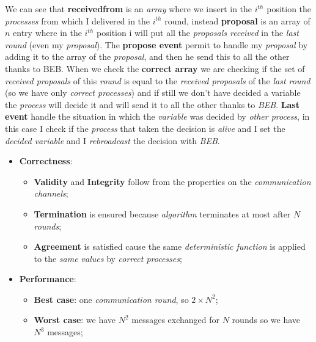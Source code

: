 \documentclass{article}
\begin{document}
We can see that \textbf{receivedfrom} is an \emph{array} where we insert in the $i^{th}$ position the \emph{processes} from which I delivered in the $i^{th}$ round, instead \textbf{proposal} is an array of $n$ entry where in the $i^{th}$ position i will put all the \emph{proposals received} in the \emph{last round} (even my \emph{proposal}). The \textbf{propose event} permit to handle my \emph{proposal} by adding it to the array of the \emph{proposal}, and then he send this to all the other thanks to BEB. When we check the \textbf{correct array} we are checking if the set of \emph{received proposals} of this \emph{round} is equal to the \emph{received proposals} of the \emph{last round} (so we have only \emph{correct processes}) and if still we don't have decided a variable the \emph{process} will decide it and will send it to all the other thanks to \emph{BEB}. \textbf{Last event} handle the situation in which the \emph{variable} was decided by \emph{other process}, in this case I check if the \emph{process} that taken the decision is \emph{alive} and I set the \emph{decided variable} and I \emph{rebroadcast} the decision with \emph{BEB}.
\begin{itemize}
\item \textbf{Correctness}:
\begin{itemize}
\item \textbf{Validity} and \textbf{Integrity} follow from the properties on the \emph{communication channels};
\item \textbf{Termination} is ensured because \emph{algorithm} terminates at most after $N$ \emph{rounds};
\item \textbf{Agreement} is satisfied cause the same \emph{deterministic function} is applied to the \emph{same values} by \emph{correct processes};
\end{itemize}
\item \textbf{Performance}:
\begin{itemize}
\item \textbf{Best case}: one \emph{communication round}, so $2 \times N^2$;
\item \textbf{Worst case}: we have $N^2$ messages exchanged for $N$ rounds so we have $N^3$ messages;
\end{itemize}
\end{itemize}
\clearpage
\end{document}
